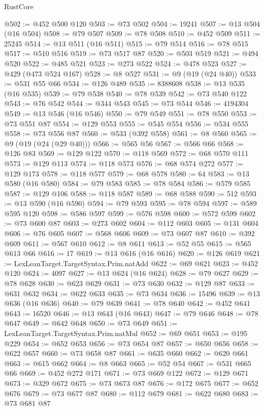 \begin{lexlean}{RustCore}
\begin{coremodule}
@502 := @452 @500 @120
@503 := @73 @502
@504 := 19241
@507 := @13 @504 (@16 @504)
@508 := @79 @507
@509 := @78 @508
@510 := @452 @509
@511 := 25245
@514 := @13 @511 (@16 @511)
@515 := @79 @514
@516 := @78 @515
@517 := @510 @516
@519 := @73 @517 @87
@520 := @503 @519
@521 := @494 @520
@522 := @485 @521
@523 := @273 @522
@524 := @478 @523
@527 := @429 (@473 @524 @167)
@528 := @8 @527
@531 := @9 (@19 (@24 @40))
@533 := @531 @55 @66
@534 := @126 @489
@535 := 8388608
@538 := @13 @535 (@16 @535)
@539 := @79 @538
@540 := @78 @539
@542 := @73 @540 @122
@543 := @76 @542
@544 := @344 @543
@545 := @73 @544
@546 := 4194304
@549 := @13 @546 (@16 @546)
@550 := @79 @549
@551 := @78 @550
@553 := @73 @551 @87
@554 := @129 @553
@555 := @545 @554
@556 := @534 @555
@558 := @73 @556 @87
@560 := @533 (@392 @558)
@561 := @8 @560
@565 := @9 (@19 (@24 (@29 @40)))
@566 := @565 @56
@567 := @566 @66
@568 := @126 @83
@569 := @129 @122
@570 := @118 @569
@572 := @68 @570 @111
@573 := @129 @113
@574 := @118 @573
@576 := @68 @574 @272
@577 := @129 @173
@578 := @118 @577
@579 := @68 @578
@580 := 64
@583 := @13 @580 (@16 @580)
@584 := @79 @583
@585 := @78 @584
@586 := @579 @585
@587 := @129 @106
@588 := @118 @587
@589 := @68 @588
@590 := 512
@593 := @13 @590 (@16 @590)
@594 := @79 @593
@595 := @78 @594
@597 := @589 @595 @120
@598 := @586 @597
@599 := @576 @598
@600 := @572 @599
@602 := @73 @600 @87
@603 := @273 @602
@604 := @112 @603
@605 := @131 @604
@606 := @76 @605
@607 := @568 @606
@609 := @73 @607 @87
@610 := @392 @609
@611 := @567 @610
@612 := @8 @611
@613 := @52 @55
@615 := @565 @613 @66
@616 := 17
@619 := @13 @616 (@16 @616)
@620 := @126 @619
@621 := LexLeanTarget.TargetSyntax.Prim.natAdd
@622 := @69 @621
@623 := @452 @120
@624 := 4097
@627 := @13 @624 (@16 @624)
@628 := @79 @627
@629 := @78 @628
@630 := @623 @629
@631 := @73 @630
@632 := @129 @87
@633 := @631 @632
@634 := @622 @633
@635 := @73 @634
@636 := 15496
@639 := @13 @636 (@16 @636)
@640 := @79 @639
@641 := @78 @640
@642 := @452 @641
@643 := 16520
@646 := @13 @643 (@16 @643)
@647 := @79 @646
@648 := @78 @647
@649 := @642 @648
@650 := @73 @649
@651 := LexLeanTarget.TargetSyntax.Prim.natMul
@652 := @69 @651
@653 := @195 @229
@654 := @652 @653
@656 := @73 @654 @87
@657 := @650 @656
@658 := @622 @657
@660 := @73 @658 @87
@661 := @635 @660
@662 := @620 @661
@663 := @615 @662
@664 := @8 @663
@665 := @52 @54
@667 := @531 @665 @66
@669 := @452 @272 @171
@671 := @73 @669 @122
@672 := @129 @671
@673 := @329 @672
@675 := @73 @673 @87
@676 := @172 @675
@677 := @652 @676
@679 := @73 @677 @87
@680 := @112 @679
@681 := @622 @680
@683 := @73 @681 @87

\end{coremodule}
\end{lexlean}
